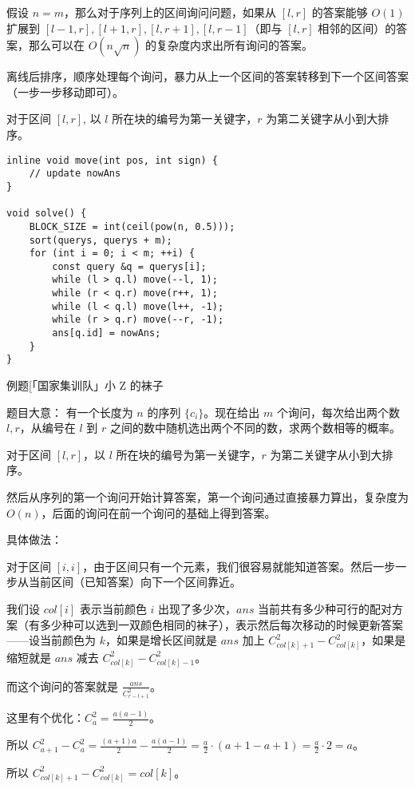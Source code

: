 假设 $n=m$，那么对于序列上的区间询问问题，如果从 $[l,r]$ 的答案能够 $O(1)$ 扩展到 $[l-1,r],[l+1,r],[l,r+1],[l,r-1]$（即与 $[l,r]$ 相邻的区间）的答案，那么可以在 $O(n\sqrt{n})$ 的复杂度内求出所有询问的答案。

离线后排序，顺序处理每个询问，暴力从上一个区间的答案转移到下一个区间答案（一步一步移动即可）。

对于区间 $[l,r]$, 以 $l$ 所在块的编号为第一关键字，$r$ 为第二关键字从小到大排序。

\begin{lstlisting}
inline void move(int pos, int sign) {
	// update nowAns
}

void solve() {
	BLOCK_SIZE = int(ceil(pow(n, 0.5)));
	sort(querys, querys + m);
	for (int i = 0; i < m; ++i) {
		const query &q = querys[i];
		while (l > q.l) move(--l, 1);
		while (r < q.r) move(r++, 1);
		while (l < q.l) move(l++, -1);
		while (r > q.r) move(--r, -1);
		ans[q.id] = nowAns;
	}
}
\end{lstlisting}

例题[「国家集训队」小 Z 的袜子

题目大意：
有一个长度为 $n$ 的序列 $\{c_i\}$。现在给出 $m$ 个询问，每次给出两个数 $l,r$，从编号在 $l$ 到 $r$ 之间的数中随机选出两个不同的数，求两个数相等的概率。

对于区间 $[l,r]$，以 $l$ 所在块的编号为第一关键字，$r$ 为第二关键字从小到大排序。

然后从序列的第一个询问开始计算答案，第一个询问通过直接暴力算出，复杂度为 $O(n)$，后面的询问在前一个询问的基础上得到答案。

具体做法：

对于区间 $[i,i]$，由于区间只有一个元素，我们很容易就能知道答案。然后一步一步从当前区间（已知答案）向下一个区间靠近。

我们设 $col[i]$ 表示当前颜色 $i$ 出现了多少次，$ans$ 当前共有多少种可行的配对方案（有多少种可以选到一双颜色相同的袜子），表示然后每次移动的时候更新答案——设当前颜色为 $k$，如果是增长区间就是 $ans$ 加上 $C_{col[k]+1}^2-C_{col[k]}^2$，如果是缩短就是 $ans$ 减去 $C_{col[k]}^2-C_{col[k]-1}^2$。

而这个询问的答案就是 $\displaystyle \frac{ans}{C_{r-l+1}^2}$。

这里有个优化：$\displaystyle C_a^2=\frac{a (a-1)}{2}$。

所以 $\displaystyle C_{a+1}^2-C_a^2=\frac{(a+1) a}{2}-\frac{a (a-1)}{2}=\frac{a}{2}\cdot (a+1-a+1)=\frac{a}{2}\cdot 2=a$。

所以 $C_{col[k]+1}^2-C_{col[k]}^2=col[k]$。

